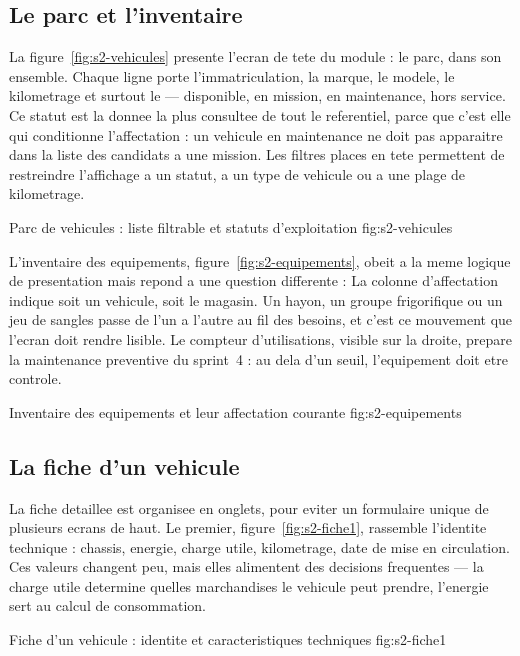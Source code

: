 \subsection{Le parc et l'inventaire}

La figure~\ref{fig:s2-vehicules} presente l'ecran de tete du module : le
parc, dans son ensemble. Chaque ligne porte l'immatriculation, la marque,
le modele, le kilometrage et surtout le  --- disponible, en mission, en maintenance, hors service.
Ce statut est la donnee la plus consultee de tout le referentiel, parce
que c'est elle qui conditionne l'affectation : un vehicule en maintenance
ne doit pas apparaitre dans la liste des candidats a une mission. Les
filtres places en tete permettent de restreindre l'affichage a un statut,
a un type de vehicule ou a une plage de kilometrage.

  {Parc de vehicules : liste filtrable et statuts d'exploitation}
  {fig:s2-vehicules}

L'inventaire des equipements, figure~\ref{fig:s2-equipements}, obeit a la
meme logique de presentation mais repond a une question differente :
 La colonne d'affectation indique soit
un vehicule, soit le magasin. Un hayon, un groupe frigorifique ou un jeu
de sangles passe de l'un a l'autre au fil des besoins, et c'est ce
mouvement que l'ecran doit rendre lisible. Le compteur d'utilisations,
visible sur la droite, prepare la maintenance preventive du sprint~4 : au
dela d'un seuil, l'equipement doit etre controle.

  {Inventaire des equipements et leur affectation courante}
  {fig:s2-equipements}

\subsection{La fiche d'un vehicule}

La fiche detaillee est organisee en onglets, pour eviter un formulaire
unique de plusieurs ecrans de haut. Le premier, figure~\ref{fig:s2-fiche1},
rassemble l'identite technique : chassis, energie, charge utile,
kilometrage, date de mise en circulation. Ces valeurs changent peu, mais
elles alimentent des decisions frequentes --- la charge utile determine
quelles marchandises le vehicule peut prendre, l'energie sert au calcul de
consommation.

  {Fiche d'un vehicule : identite et caracteristiques techniques}
  {fig:s2-fiche1}

